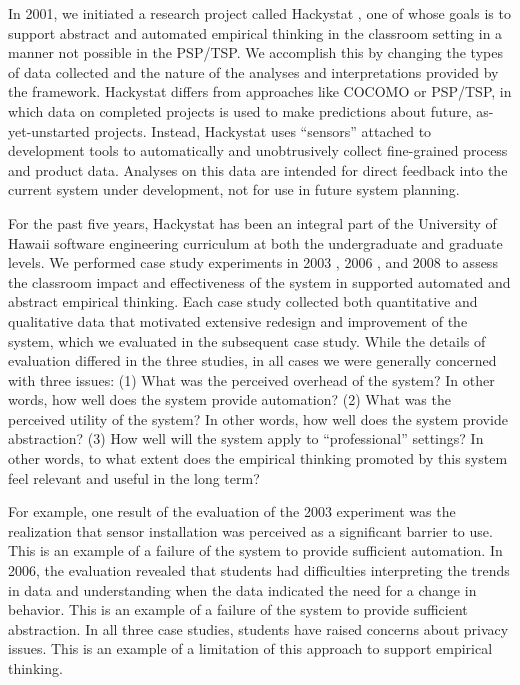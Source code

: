 In 2001, we initiated a research project called Hackystat \citep{csdl2-06-06,csdl2-04-11,csdl2-02-07},
one of whose goals is to support abstract and automated empirical thinking
in the classroom setting in a manner not possible in the PSP/TSP.  We
accomplish this by changing the types of data collected and the nature of
the analyses and interpretations provided by the framework.  Hackystat
differs from approaches like COCOMO or PSP/TSP, in which data on completed
projects is used to make predictions about future, as-yet-unstarted
projects. Instead, Hackystat uses ``sensors'' attached to development tools
to automatically and unobtrusively collect fine-grained process and product
data. Analyses on this data are intended for direct feedback into the
current system under development, not for use in future system planning.

For the past five years, Hackystat has been an integral part of the
University of Hawaii software engineering curriculum at both the
undergraduate and graduate levels.  We performed case study experiments in
2003 \citep{csdl2-03-12,csdl2-03-13}, 2006 \citep{csdl2-07-02}, and 2008
\citep{csdl2-09-02,csdl2-09-03} to assess the classroom impact and
effectiveness of the system in supported automated and abstract empirical
thinking.  Each case study collected both quantitative and qualitative data
that motivated extensive redesign and improvement of the system, which we
evaluated in the subsequent case study. While the details of evaluation
differed in the three studies, in all cases we were generally concerned
with three issues: (1) What was the perceived overhead of the system? In
other words, how well does the system provide automation?  (2) What was the
perceived utility of the system? In other words, how well does the system
provide abstraction?  (3) How well will the system apply to
``professional'' settings?  In other words, to what extent does the
empirical thinking promoted by this system feel relevant and useful in the
long term?

For example, one result of the evaluation of the 2003 experiment was the
realization that sensor installation was perceived as a significant barrier
to use. This is an example of a failure of the system to provide sufficient
automation.  In 2006, the evaluation revealed that students had
difficulties interpreting the trends in data and understanding when the
data indicated the need for a change in behavior.  This is an example of a
failure of the system to provide sufficient abstraction.  In all three case
studies, students have raised concerns about privacy issues.  This is an
example of a limitation of this approach to support empirical thinking.

